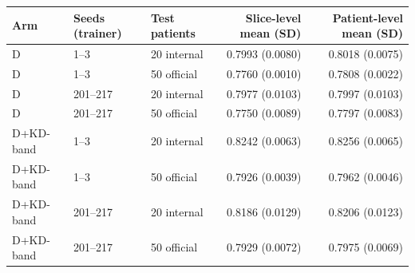 \begin{tabular}{@{}lllrr@{}}
\toprule
Arm & Seeds (trainer) & Test patients & Slice-level mean (SD) & Patient-level mean (SD) \\
\midrule
D & 1--3 & 20 internal & 0.7993 (0.0080) & 0.8018 (0.0075) \\
D & 1--3 & 50 official & 0.7760 (0.0010) & 0.7808 (0.0022) \\
D & 201--217 & 20 internal & 0.7977 (0.0103) & 0.7997 (0.0103) \\
D & 201--217 & 50 official & 0.7750 (0.0089) & 0.7797 (0.0083) \\
\midrule
D+KD-band & 1--3 & 20 internal & 0.8242 (0.0063) & 0.8256 (0.0065) \\
D+KD-band & 1--3 & 50 official & 0.7926 (0.0039) & 0.7962 (0.0046) \\
D+KD-band & 201--217 & 20 internal & 0.8186 (0.0129) & 0.8206 (0.0123) \\
D+KD-band & 201--217 & 50 official & 0.7929 (0.0072) & 0.7975 (0.0069) \\
\bottomrule
\end{tabular}
